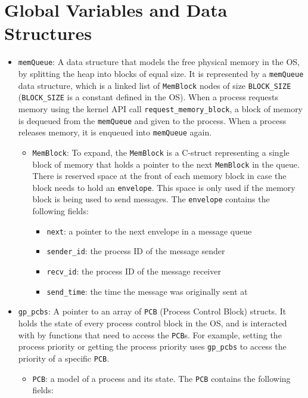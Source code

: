 \documentclass[12pt]{report}
\begin{document}
\section{Global Variables and Data Structures}
\begin{itemize}
  \item \texttt{memQueue}: A data structure that models the free physical memory in the OS, by splitting the heap into blocks of equal size. It is represented by a \texttt{memQueue} data structure, which is a linked list of \texttt{MemBlock} nodes of size \texttt{BLOCK_SIZE} (\texttt{BLOCK_SIZE} is a constant defined in the OS). When a process requests memory using the kernel API call \texttt{request\_memory\_block}, a block of memory is dequeued from the \texttt{memQueue} and given to the process.  When a process releases memory, it is enqueued into \texttt{memQueue} again.
    \begin{itemize}
      \item \texttt{MemBlock}: To expand, the \texttt{MemBlock} is a C-struct representing a single block of memory that holds a pointer to the next \texttt{MemBlock} in the queue. There is reserved space at the front of each memory block in case the block needs to hold an \texttt{envelope}. This space is only used if the memory block is being used to send messages.  The \texttt{envelope} contains the following fields:
        \begin{itemize}
          \item \texttt{next}: a pointer to the next envelope in a message queue
          \item \texttt{sender_id}: the process ID of the message sender
          \item \texttt{recv_id}: the process ID of the message receiver
          \item \texttt{send_time}: the time the message was originally sent at
        \end{itemize}
    \end{itemize}
  \item \texttt{gp_pcbs}: A pointer to an array of \texttt{PCB} (Process Control Block) structs. It holds the state of every process control block in the OS, and is interacted with by functions that need to access the \texttt{PCB}s. For example, setting the process priority or getting the process priority uses \texttt{gp_pcbs} to access the priority of a specific \texttt{PCB}.
    \begin{itemize}
      \item \texttt{PCB}: a model of a process and its state. The \texttt{PCB} contains the following fields:

\end{itemize}
\end{itemize}
\end{document}
